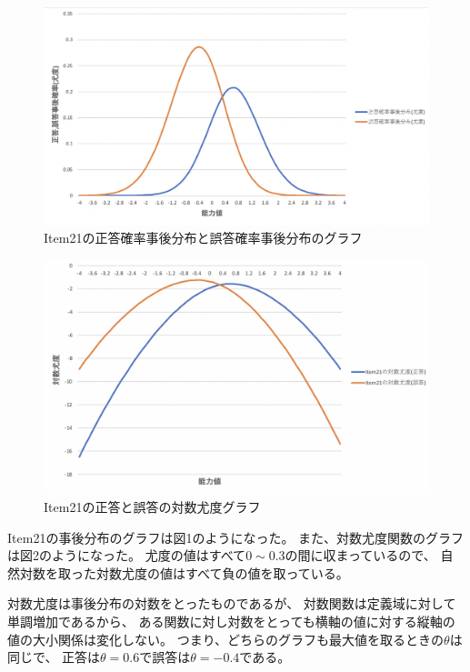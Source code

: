 \documentclass[12pt]{jarticle}
\begin{document}
\begin{figure}[h]
    \begin{center}
        \includegraphics[scale=0.3]{kadai5_3_1.png}
    \end{center}
    \caption{Item21の正答確率事後分布と誤答確率事後分布のグラフ}
\end{figure}

\clearpage
\begin{figure}[h]
    \begin{center}
        \includegraphics[scale=0.3]{kadai5_3_2.png}
    \end{center}
    \caption{Item21の正答と誤答の対数尤度グラフ}
\end{figure}

Item21の事後分布のグラフは図1のようになった。
また、対数尤度関数のグラフは図2のようになった。
尤度の値はすべて$0\sim 0.3$の間に収まっているので、
自然対数を取った対数尤度の値はすべて負の値を取っている。

対数尤度は事後分布の対数をとったものであるが、
対数関数は定義域に対して単調増加であるから、
ある関数に対し対数をとっても横軸の値に対する縦軸の値の大小関係は変化しない。
つまり、どちらのグラフも最大値を取るときの$\theta$は同じで、
正答は$\theta=0.6$で誤答は$\theta=-0.4$である。
\end{document}
